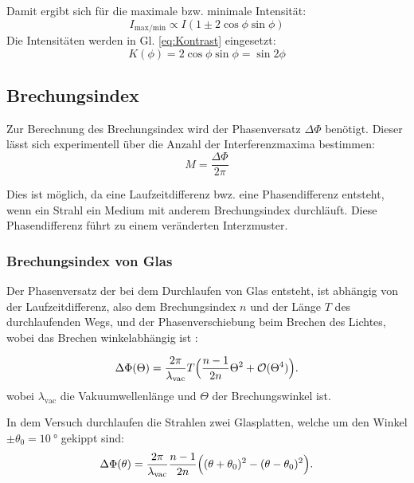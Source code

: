 Damit ergibt sich für die maximale bzw. minimale Intensität:
\begin{equation}
  I_{\text{max/min}} \propto I(1\pm 2\cos{\phi}\sin{\phi})
  \label{eq:imaxmin}
\end{equation}
\noindent Die Intensitäten werden in Gl. \eqref{eq:Kontrast} eingesetzt:
\begin{equation}
  \label{eqn:K}
  K(\phi)=2\cos{\phi}\sin{\phi}=\sin{2\phi}
\end{equation}

\subsection{Brechungsindex}%
Zur Berechnung des Brechungsindex wird der Phasenversatz $\Delta \Phi$ benötigt.
Dieser lässt sich experimentell über die Anzahl der Interferenzmaxima bestimmen:
\begin{equation}
  M=\frac{\Delta \Phi}{2\pi}
  \label{eq:AnzMax}
\end{equation}

Dies ist möglich, 
da eine Laufzeitdifferenz bwz. eine Phasendifferenz entsteht,
wenn ein Strahl ein Medium mit anderem Brechungsindex durchläuft.
Diese Phasendifferenz führt zu einem veränderten Interzmuster.

\subsubsection{Brechungsindex von Glas}%
Der Phasenversatz der bei dem Durchlaufen von Glas entsteht,
ist abhängig von der Laufzeitdifferenz, 
also dem Brechungsindex $n$ und der Länge $T$ des durchlaufenden Wegs,
und der Phasenverschiebung beim Brechen des Lichtes,
wobei das Brechen winkelabhängig ist \cite{V64}:

\begin{equation}
\Delta \Phi
(\Theta)=\frac{2\pi}{\lambda_{\text{vac}}}T\Bigl(\frac{n-1}{2n}\Theta^2+\mathcal{O}(\Theta^4)   \Bigr) .
\label{eq:nGlas}
\end{equation}
\noindent wobei $\lambda_{\text{vac}}$ die Vakuumwellenlänge 
und $\Theta$ der Brechungswinkel ist.



In dem Versuch durchlaufen die Strahlen zwei Glasplatten,
welche um den Winkel $ \pm \theta_0 = \SI{10}{\degree}$ gekippt sind:
\begin{equation*}
  \Delta \Phi(\theta)= \frac{2\pi}{\lambda_{\text{vac}}}\frac{n-1}{2n} \Bigl( (\theta + \theta_0)^2 - (\theta - \theta_0)^2 \Bigr) . 
\end{equation*}



